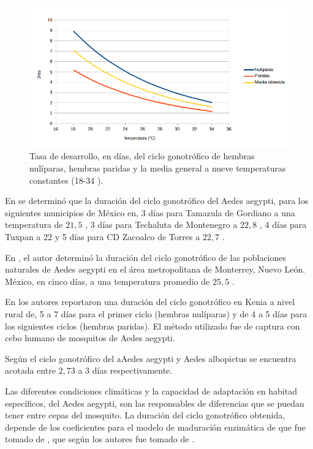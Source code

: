 \begin{figure}[!htbp]
    \centering
    \includegraphics[width=1\textwidth]{capitulo-6/graphics/ciclo-gonotrofico-temperatura.png}
    \caption{\label{fig:ciclo-gonotrofico-temperatura} Tasa de desarrollo, en días, del ciclo
    gonotrófico de hembras nulíparas, hembras paridas y la media general a nueve temperaturas
    constantes (18-34 \textcelsius).}
\end{figure}

En \cite{beltran2001bionomia} se determinó que la duración del ciclo gonotrófico del Aedes
aegypti, para los siguientes municipios de México en, 3 días para Tamazula de Gordiano a una
temperatura de $21,5$ \textcelsius, 3 días para Techaluta de Montenegro a $22,8$ \textcelsius, 4
días para Tuxpan a 22 \textcelsius y 5 días para CD Zacoalco de Torres a $22,7$ \textcelsius.

En \cite{luevano1993ciclo}, el autor determinó la duración del ciclo gonotrófico de las
poblaciones naturales de Aedes aegypti en el área metropolitana de Monterrey, Nuevo León. México,
en cinco días, a una temperatura promedio de $25,5$ \textcelsius.

En \cite{trpis1986dispersal} los autores reportaron una duración del ciclo gonotrófico en Kenia a
nivel rural de, 5 a 7 días para el primer ciclo (hembras nulíparas) y de 4 a 5 días para los
siguientes ciclos (hembras paridas). El método utilizado fue de captura con cebo humano de
mosquitos de Aedes aegypti.

Según \cite{sivanathan2006ecology} el ciclo gonotrófico del aAedes aegypti y Aedes albopictus se
encuentra acotada entre $2,73$ a 3 días respectivamente.

Las diferentes condiciones climáticas y la capacidad de adaptación en habitad específicos, del
Aedes aegypti, son las responsables de diferencias que se puedan tener entre cepas del mosquito.
La duración del ciclo gonotrófico obtenida, depende de los coeficientes para el modelo de
maduración enzimática de \cite{sharpe1977reaction} que fue tomado de \cite{otero2006stochastic},
que según los autores fue tomado de \cite{focks1993dynamic}.

